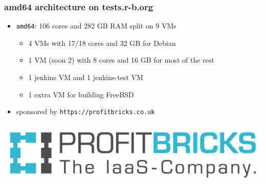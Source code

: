 \documentclass[14pt]{beamer}
\begin{document}
\begin{frame}
 \frametitle{amd64 architecture on tests.r-b.org}

 \begin{itemize}
  \item \texttt{amd64}: 106 cores and 282 GB RAM split on 9 VMs
  \begin{itemize}
   \item 4 VMs with 17/18 cores and 32 GB for Debian
   \item 1 VM (soon 2) with 8 cores and 16 GB for most of the rest
   \item 1 jenkins VM and 1 jenkins-test VM
   \item 1 extra VM for building FreeBSD
 \end{itemize}
 \item sponsored by \texttt{https://profitbricks.co.uk}
 \end{itemize}
 \begin{center}
  \includegraphics[height=0.2\paperheight]{images/profitbricks_logo.png}
  \vfill
 \end{center}
\end{frame}
\end{document}
